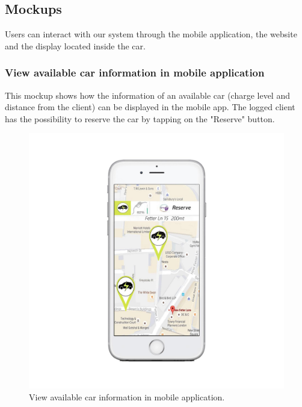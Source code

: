 \subsection{Mockups}
Users can interact with our system through the mobile application, the website and the display located inside the car.

\subsubsection*{View available car information in mobile application} This mockup shows how the information of an available car (charge level and distance from the client) can be displayed in the mobile app. The logged client has the possibility to reserve the car by tapping on the "Reserve" button.
\begin{figure}[hp]
\centering
\includegraphics[width=470 pt]{resources/editato.jpg}
\caption{\label{fig:editato}View available car information in mobile application.}
\end{figure}

\newpage

